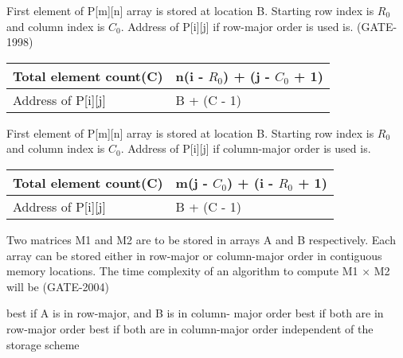 \begin{questyle}
  \question  First element of P[m][n] array is stored at location B. Starting row index is \( R_0 \) and column index is \( C_0 \).
            Address of P[i][j] if row-major order is used is. (GATE- 1998)\\
            \begin{myTableStyle}
                \begin{tabular}{ |m{4cm}|m{8cm}| } \hline
                    Total element count(C)  &     n(i - \( R_0 \)) + (j - \( C_0 \) + 1)         \\ \hline
                    Address of P[i][j]      &     B + (C - 1)    \\ \hline
                \end{tabular}
            \end{myTableStyle}
            \vspace{0.08in}

\end{questyle}


\begin{questyle}
  \question  First element of P[m][n] array is stored at location B. Starting row index is \( R_0 \) and column index is \( C_0 \).
            Address of P[i][j] if column-major order is used is. \\
            \begin{myTableStyle}
                \begin{tabular}{ |m{4cm}|m{8cm}| } \hline
                    Total element count(C)  &     m(j - \( C_0 \)) + (i - \( R_0 \) + 1)         \\ \hline
                    Address of P[i][j]      &     B + (C - 1)    \\ \hline
                \end{tabular}
            \end{myTableStyle}
            \vspace{0.08in}
\end{questyle}

\begin{questyle}
  \question  Two matrices M1 and M2 are to be stored in arrays A and B respectively. Each array can be stored
             either in row-major or column-major order in contiguous memory locations. The time complexity of an algorithm
             to compute M1 × M2 will be  (GATE-2004)

  \begin{choices}
    \choice         best if A is in row-major, and B is in column- major order
    \choice         best if both are in row-major order
    \choice         best if both are in column-major order
    \CorrectChoice  independent of the storage scheme
  \end{choices}
\end{questyle}

